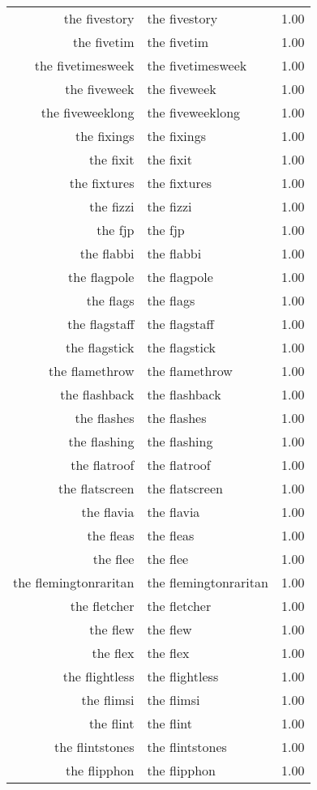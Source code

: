 \begin{table}[ht]
\begin{tabular}{rlr}
  the fivestory & the fivestory & 1.00 \\ 
  the fivetim & the fivetim & 1.00 \\ 
  the fivetimesweek & the fivetimesweek & 1.00 \\ 
  the fiveweek & the fiveweek & 1.00 \\ 
  the fiveweeklong & the fiveweeklong & 1.00 \\ 
  the fixings & the fixings & 1.00 \\ 
  the fixit & the fixit & 1.00 \\ 
  the fixtures & the fixtures & 1.00 \\ 
  the fizzi & the fizzi & 1.00 \\ 
  the fjp & the fjp & 1.00 \\ 
  the flabbi & the flabbi & 1.00 \\ 
  the flagpole & the flagpole & 1.00 \\ 
  the flags & the flags & 1.00 \\ 
  the flagstaff & the flagstaff & 1.00 \\ 
  the flagstick & the flagstick & 1.00 \\ 
  the flamethrow & the flamethrow & 1.00 \\ 
  the flashback & the flashback & 1.00 \\ 
  the flashes & the flashes & 1.00 \\ 
  the flashing & the flashing & 1.00 \\ 
  the flatroof & the flatroof & 1.00 \\ 
  the flatscreen & the flatscreen & 1.00 \\ 
  the flavia & the flavia & 1.00 \\ 
  the fleas & the fleas & 1.00 \\ 
  the flee & the flee & 1.00 \\ 
  the flemingtonraritan & the flemingtonraritan & 1.00 \\ 
  the fletcher & the fletcher & 1.00 \\ 
  the flew & the flew & 1.00 \\ 
  the flex & the flex & 1.00 \\ 
  the flightless & the flightless & 1.00 \\ 
  the flimsi & the flimsi & 1.00 \\ 
  the flint & the flint & 1.00 \\ 
  the flintstones & the flintstones & 1.00 \\ 
  the flipphon & the flipphon & 1.00 \\ 

\end{tabular}
\end{table}
